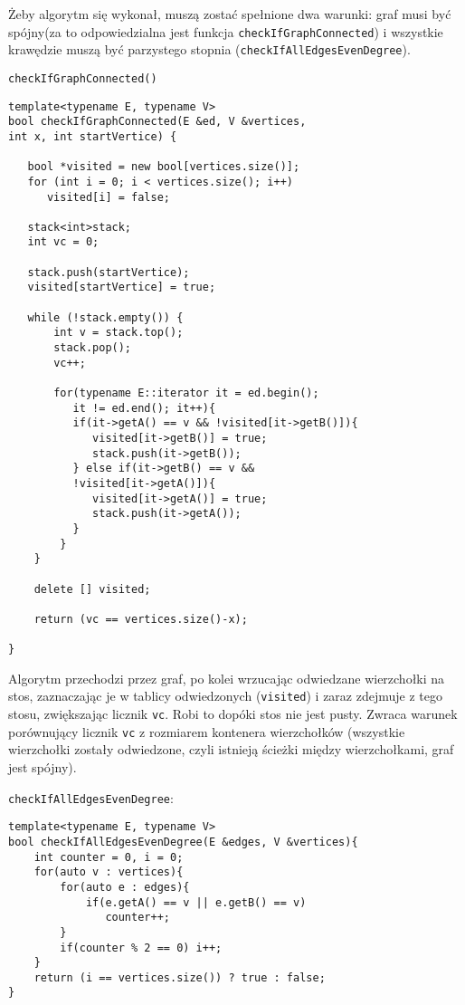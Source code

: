 \documentclass[11pt, a4paper]{article}
\begin{document}
Żeby algorytm się wykonał, muszą zostać spełnione dwa warunki: graf musi być spójny(za to odpowiedzialna jest funkcja \verb#checkIfGraphConnected#) i wszystkie krawędzie muszą być parzystego stopnia (\verb#checkIfAllEdgesEvenDegree#).

\verb#checkIfGraphConnected()#
\begin{lstlisting}[frame=single]
template<typename E, typename V>
bool checkIfGraphConnected(E &ed, V &vertices,
int x, int startVertice) {
    
   bool *visited = new bool[vertices.size()];
   for (int i = 0; i < vertices.size(); i++) 
      visited[i] = false;

   stack<int>stack;
   int vc = 0;
    
   stack.push(startVertice);
   visited[startVertice] = true;
    
   while (!stack.empty()) {
       int v = stack.top();
       stack.pop();
       vc++;
    
       for(typename E::iterator it = ed.begin();
          it != ed.end(); it++){
          if(it->getA() == v && !visited[it->getB()]){
             visited[it->getB()] = true;
             stack.push(it->getB());
          } else if(it->getB() == v &&
          !visited[it->getA()]){
             visited[it->getA()] = true;
             stack.push(it->getA());
          }
        }
    }

    delete [] visited;

    return (vc == vertices.size()-x);

}
\end{lstlisting}

Algorytm przechodzi przez graf, po kolei wrzucając odwiedzane wierzchołki na stos, zaznaczając je w tablicy odwiedzonych (\verb#visited#) i zaraz zdejmuje z tego stosu, zwiększając licznik \verb#vc#. Robi to dopóki stos nie jest pusty. Zwraca warunek porównujący licznik \verb#vc# z rozmiarem kontenera wierzchołków (wszystkie wierzchołki zostały odwiedzone, czyli istnieją ścieżki między wierzchołkami, graf jest spójny).

\verb#checkIfAllEdgesEvenDegree#:
\begin{lstlisting}[frame=single]
template<typename E, typename V>
bool checkIfAllEdgesEvenDegree(E &edges, V &vertices){
    int counter = 0, i = 0;
    for(auto v : vertices){
        for(auto e : edges){
            if(e.getA() == v || e.getB() == v)
               counter++;
        }
        if(counter % 2 == 0) i++;
    }
    return (i == vertices.size()) ? true : false;
}
\end{lstlisting}
\end{document}
